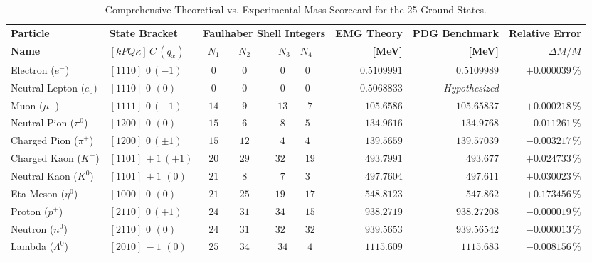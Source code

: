 \documentclass[
    12pt,
    a4paper,
    headings=normal,
    twoside=false,
    open=any,
    parskip=half
]{scrbook}
\begin{document}
\begin{table}[htbp]
\centering
\small
\caption{Comprehensive Theoretical vs. Experimental Mass Scorecard for the 25 Ground States.}
\label{tab:ch5_complete_25_ground_states_verified}
\begin{adjustbox}{max width=\textwidth}
\begin{tabular}{llcccrrr}\toprule
\textbf{Particle} & \textbf{State Bracket} & \multicolumn{3}{c}{\textbf{Faulhaber Shell Integers}} & \textbf{EMG Theory} & \textbf{PDG Benchmark} & \textbf{Relative Error} \\
\textbf{Name} & $[kPQ\kappa]\,C\,(q_x)$ & $N_1$ & $N_2$ & $N_3 \quad N_4$ & \textbf{[MeV]} & \textbf{[MeV]} & $\Delta M / M$ \\\midrule
\rowcolor{secondarycolor!8}
Electron ($e^-$) & $[1110]\,\,0\,(-1)$ & $0$ & $0$ & $0 \qquad 0$ & $0.5109991$ & $0.5109989$ & $+0.000039\,\%$ \\
Neutral Lepton ($e_0$) & $[1110]\,\,0\,\,(0)$ & $0$ & $0$ & $0 \qquad 0$ & $0.5068833$ & \textit{Hypothesized} & --- \\
\rowcolor{secondarycolor!8}
Muon ($\mu^-$) & $[1111]\,\,0\,(-1)$ & $14$ & $9$ & $13 \qquad 7$ & $105.6586$ & $105.65837$ & $+0.000218\,\%$ \\
Neutral Pion ($\pi^0$) & $[1200]\,\,0\,\,(0)$ & $15$ & $6$ & $8 \qquad 5$ & $134.9616$ & $134.9768$ & $-0.011261\,\%$ \\
\rowcolor{secondarycolor!8}
Charged Pion ($\pi^\pm$) & $[1200]\,\,0\,(\pm 1)$ & $15$ & $12$ & $4 \qquad 4$ & $139.5659$ & $139.57039$ & $-0.003217\,\%$ \\
Charged Kaon ($K^+$) & $[1101]\,+1\,(+1)$ & $20$ & $29$ & $32 \qquad 19$ & $493.7991$ & $493.677$ & $+0.024733\,\%$ \\
\rowcolor{secondarycolor!8}
Neutral Kaon ($K^0$) & $[1101]\,+1\,\,(0)$ & $21$ & $8$ & $7 \qquad 3$ & $497.7604$ & $497.611$ & $+0.030023\,\%$ \\
Eta Meson ($\eta^0$) & $[1000]\,\,0\,\,(0)$ & $21$ & $25$ & $19 \qquad 17$ & $548.8123$ & $547.862$ & $+0.173456\,\%$ \\
\rowcolor{secondarycolor!8}
Proton ($p^+$) & $[2110]\,\,0\,(+1)$ & $24$ & $31$ & $34 \qquad 15$ & $938.2719$ & $938.27208$ & $-0.000019\,\%$ \\
Neutron ($n^0$) & $[2110]\,\,0\,\,(0)$ & $24$ & $31$ & $32 \qquad 32$ & $939.5653$ & $939.56542$ & $-0.000013\,\%$ \\
\rowcolor{secondarycolor!8}
Lambda ($\Lambda^0$) & $[2010]\,-1\,\,(0)$ & $25$ & $34$ & $34 \qquad 4$ & $1115.609$ & $1115.683$ & $-0.008156\,\%$ \\

\end{tabular}
\end{adjustbox}
\end{table}
\end{document}
